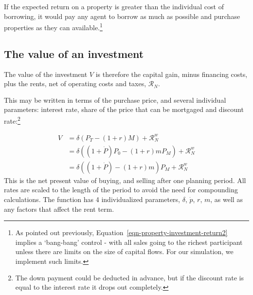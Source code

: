 If the expected return on a property is greater than the individual cost of borrowing, it would pay any agent to borrow as much as possible and purchase properties as they can available.\footnote{As pointed out previously,  Equation~\ref{eqn-property-investment-return2} implies a `bang-bang' control - with all sales going to the richest participant unless there are limits on the size of capital flows. For our simulation, we implement such limits. } 
 




 \subsection{The value of an investment}
The value of the investment $V$ is therefore the capital gain, minus financing costs, plus the rents, net of operating costs and taxes, $\mathcal{R}_N$.
 
 This may be written in terms of the purchase price, and several individual parameters: interest  rate, share of the price that can be mortgaged and  discount rate:\footnote{The down payment could be deducted in advance, but if the discount rate is equal to the interest rate it drops out completely.}
 
\begin{align}
V &= \delta \left(P_T - (1+r)M\right) +   \mathcal{R}^w_N   \\
&= \delta \left((1+\dot P) P_0 - (1+r)mP_M\right)  +      \mathcal{R}^w_N \\
  &= \delta \left((1+\dot P)    - (1+r)m    \right) P_M + \mathcal{R}^w_N 
\end{align}
This is the net present value of buying, and selling after one planning period. All rates are scaled to the length of the period to avoid the need for compounding calculations. The function has 4 individualized  parameters, $\delta$, $\dot p$, $r$, $m$, as well as any factors that affect the rent term.


